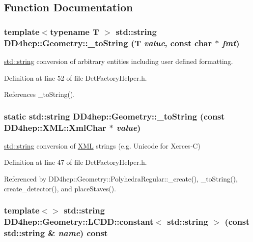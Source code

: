 \subsection{Function Documentation}
\hypertarget{namespace_d_d4hep_1_1_geometry_a52e595323e8bc63ad176e45ff89fa0a5}{
\subsubsection[{\_\-toString}]{\setlength{\rightskip}{0pt plus 5cm}template$<$typename T $>$ std::string DD4hep::Geometry::\_\-toString ({\bf T} {\em value}, \/  const char $\ast$ {\em fmt})}}
\label{namespace_d_d4hep_1_1_geometry_a52e595323e8bc63ad176e45ff89fa0a5}


\hyperlink{classstd_1_1string}{std::string} conversion of arbitrary entities including user defined formatting. 

Definition at line 52 of file DetFactoryHelper.h.

References \_\-toString().\hypertarget{namespace_d_d4hep_1_1_geometry_abb6544cdd599b803023143aefeec44d7}{
\subsubsection[{\_\-toString}]{\setlength{\rightskip}{0pt plus 5cm}static std::string DD4hep::Geometry::\_\-toString (const {\bf DD4hep::XML::XmlChar} $\ast$ {\em value})}}
\label{namespace_d_d4hep_1_1_geometry_abb6544cdd599b803023143aefeec44d7}


\hyperlink{classstd_1_1string}{std::string} conversion of \hyperlink{namespace_d_d4hep_1_1_x_m_l}{XML} strings (e.g. Unicode for Xerces-\/C) 

Definition at line 47 of file DetFactoryHelper.h.

Referenced by DD4hep::Geometry::PolyhedraRegular::\_\-create(), \_\-toString(), create\_\-detector(), and placeStaves().\hypertarget{namespace_d_d4hep_1_1_geometry_a843a7721428e666fa132e20b0706a6ff}{
\subsubsection[{LCDD::constant$<$ std::string $>$}]{\setlength{\rightskip}{0pt plus 5cm}template$<$$>$ std::string DD4hep::Geometry::LCDD::constant$<$ std::string $>$ (const std::string \& {\em name}) const}}
\label{namespace_d_d4hep_1_1_geometry_a843a7721428e666fa132e20b0706a6ff}


